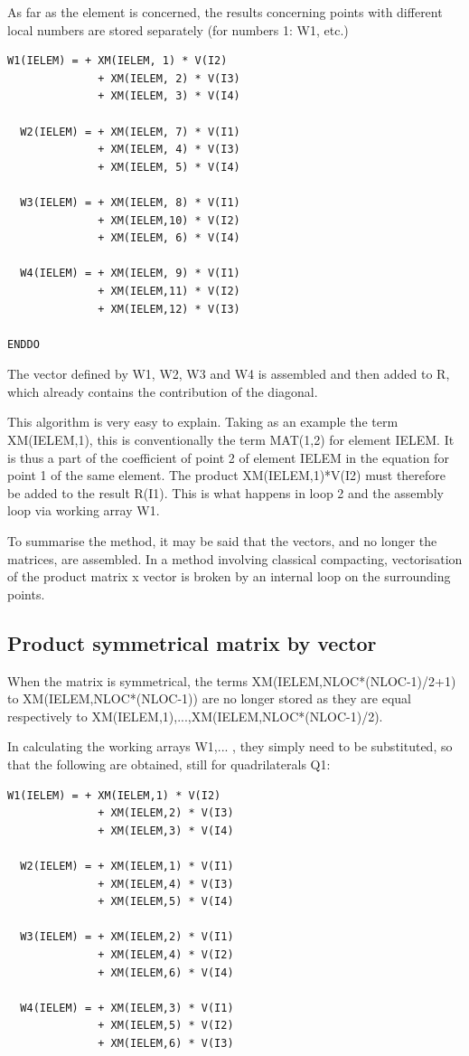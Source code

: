 As far as the element is concerned, the results concerning points with different local numbers are stored separately (for numbers 1: W1,  etc.)

\begin{lstlisting}[language=TelFortran]
  W1(IELEM) = + XM(IELEM, 1) * V(I2)
              + XM(IELEM, 2) * V(I3)
              + XM(IELEM, 3) * V(I4)

  W2(IELEM) = + XM(IELEM, 7) * V(I1)
              + XM(IELEM, 4) * V(I3)
              + XM(IELEM, 5) * V(I4)

  W3(IELEM) = + XM(IELEM, 8) * V(I1)
              + XM(IELEM,10) * V(I2)
              + XM(IELEM, 6) * V(I4)

  W4(IELEM) = + XM(IELEM, 9) * V(I1)
              + XM(IELEM,11) * V(I2)
              + XM(IELEM,12) * V(I3)

ENDDO
\end{lstlisting}

The vector defined by W1, W2, W3 and W4 is assembled and then added to R, which
already contains the contribution of the diagonal.

This algorithm is very easy to explain. Taking as an example the term
XM(IELEM,1), this is conventionally the term MAT(1,2) for element IELEM. It is
thus a part of the coefficient of point 2 of element IELEM in the equation for
point 1 of the same element. The product XM(IELEM,1)*V(I2) must therefore be
added to the result R(I1). This is what happens in loop 2 and the assembly loop
via working array W1.

To summarise the method, it may be said that the vectors, and no longer the
matrices, are assembled. In a method involving classical compacting,
vectorisation of the product matrix x vector is broken by an internal loop on
the surrounding points.

\subsection{Product symmetrical matrix by vector}

When the matrix is symmetrical, the terms XM(IELEM,NLOC*(NLOC-1)/2+1) to
XM(IELEM,NLOC*(NLOC-1)) are no longer stored as they are equal respectively to
XM(IELEM,1),...,XM(IELEM,NLOC*(NLOC-1)/2).

In calculating the working arrays W1,... , they simply need to be substituted,
so that the following are obtained, still for quadrilaterals Q1:
\begin{lstlisting}[language=TelFortran]
  W1(IELEM) = + XM(IELEM,1) * V(I2)
              + XM(IELEM,2) * V(I3)
              + XM(IELEM,3) * V(I4)

  W2(IELEM) = + XM(IELEM,1) * V(I1)
              + XM(IELEM,4) * V(I3)
              + XM(IELEM,5) * V(I4)

  W3(IELEM) = + XM(IELEM,2) * V(I1)
              + XM(IELEM,4) * V(I2)
              + XM(IELEM,6) * V(I4)

  W4(IELEM) = + XM(IELEM,3) * V(I1)
              + XM(IELEM,5) * V(I2)
              + XM(IELEM,6) * V(I3)
\end{lstlisting}


